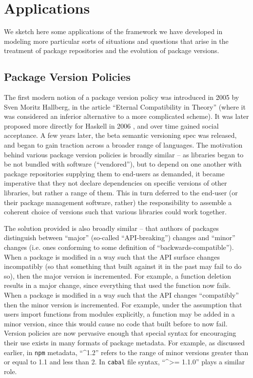 \documentclass[hoptionsi,review,screen,format=sigconf]{acmart}
\theoremstyle{definition}
\begin{document}

\section{Applications}

We sketch here some applications of the framework we have developed in modeling more particular sorts of situations and questions that arise in the treatment of package repositories and the evolution of package versions.


\subsection{Package Version Policies}

The first modern notion of a package version policy was introduced in 2005 by Sven Moritz Hallberg, in the article ``Eternal Compatibility in Theory'' \cite{ect} (where it was considered an inferior alternative to a more complicated scheme). It was later proposed more directly for Haskell in 2006 \cite{librarypolicy}, and over time gained social acceptance. A few years later, the beta semantic versioning spec \cite{semver} was released, and began to gain traction across a broader range of languages. The motivation behind various package version policies is broadly similar -- as libraries began to be not bundled with software (``vendored''), but to depend on one another with package repositories supplying them to end-users as demanded, it became imperative that they not declare dependencies on specific versions of other libraries, but rather a range of them. This in turn deferred to the end-user (or their package management software, rather) the responsibility to assemble a coherent choice of versions such that various libraries could work together. 

The solution provided is also broadly similar -- that authors of packages distinguish between ``major'' (so-called ``API-breaking'') changes and ``minor'' changes (i.e. ones conforming to some definition of ``backwards-compatible''). When a package is modified in a way such that the API surface changes incompatibly (so that something that built against it in the past may fail to do so), then the major version is incremented. For example, a function deletion results in a major change, since everything that used the function now fails. When a package is modified in a way such that the API changes ``compatibly'' then the minor version is incremented. For example, under the assumption that users import functions from modules explicitly, a function may be added in a minor version, since this would cause no code that built before to now fail. Version policies are now pervasive enough that special syntax for encouraging their use exists in many formats of package metadata. For example, as discussed earlier, in \texttt{npm} metadata, ``\^{}1.2'' refers to the range of minor versions greater than or equal to 1.1 and less than 2. In \texttt{cabal} file syntax, ``\^{}>= 1.1.0'' plays a similar role.
\end{document}
